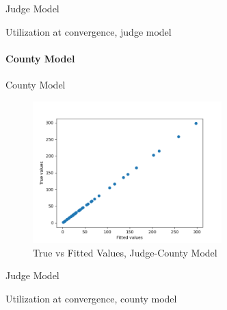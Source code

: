 \documentclass[11pt, oneside]{article}   	%
\theoremstyle{ModifiedStyle}
\begin{document}
				\begin{table}[H]
					\centering
					\caption{Judge Model}
					
				\end{table}

				\begin{table}[H]
					\centering
					\small
					\caption{Utilization at convergence, judge model}
					
				\end{table}

			\paragraph{County Model}

				\begin{table}[H]
					\centering
					\caption{County Model}
					
				\end{table}

				\begin{figure}[H]
					\centering
					\includegraphics[width=0.65\textwidth]{../../output/figures/Exploration/fit_utilization_County}
					\caption{True vs Fitted Values, Judge-County Model}
				\end{figure}

				\begin{table}[H]
					\centering
					\caption{Judge Model}
					
				\end{table}

				\begin{table}[H]
					\centering
					\small
					\caption{Utilization at convergence, county model}
					
				\end{table}
\end{document}
